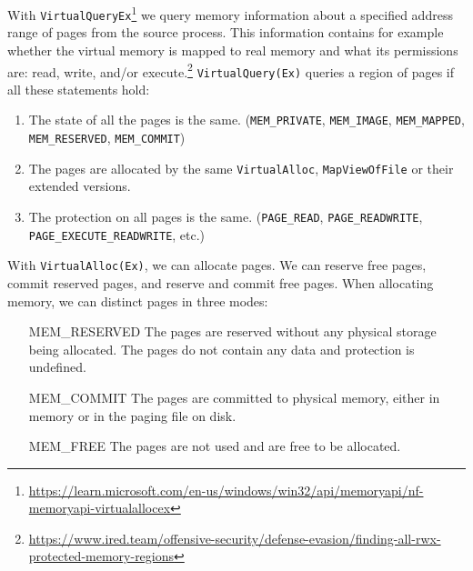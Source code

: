 \documentclass[a4paper, 11pt, english]{report}
\begin{document}
With \texttt{VirtualQueryEx}\footnote{\url{https://learn.microsoft.com/en-us/windows/win32/api/memoryapi/nf-memoryapi-virtualallocex}} we query memory information about a specified address range of pages from the source process. This information contains for example whether the virtual memory is mapped to real memory and what its permissions are: read, write, and/or execute.\footnote{\url{https://www.ired.team/offensive-security/defense-evasion/finding-all-rwx-protected-memory-regions}} 
\texttt{VirtualQuery(Ex)} queries a region of pages if all these statements hold: 
\begin{enumerate}
	\item The state of all the pages is the same. (\texttt{MEM\_PRIVATE}, \texttt{MEM\_IMAGE}, \texttt{MEM\_MAPPED}, \texttt{MEM\_RESERVED}, \texttt{MEM\_COMMIT})
	\item The pages are allocated by the same \texttt{VirtualAlloc}, \texttt{MapViewOfFile} or their extended versions.
	\item The protection on all pages is the same. (\texttt{PAGE\_READ}, \texttt{PAGE\_READWRITE}, \texttt{PAGE\_EXECUTE\_READWRITE}, etc.)
\end{enumerate}

With \texttt{VirtualAlloc(Ex)}, we can allocate pages. We can reserve free pages, commit reserved pages, and reserve and commit free pages.
When allocating memory, we can distinct pages in three modes:
\begin{enumerate}[font=\texttt,leftmargin=2.7cm]
	\item[MEM\_RESERVED] The pages are reserved without any physical storage being allocated. The pages do not contain any data and protection is undefined.
	\item[MEM\_COMMIT] The pages are committed to physical memory, either in memory or in the paging file on disk. 
	\item[MEM\_FREE] The pages are not used and are free to be allocated.
\end{enumerate}
\end{document}

